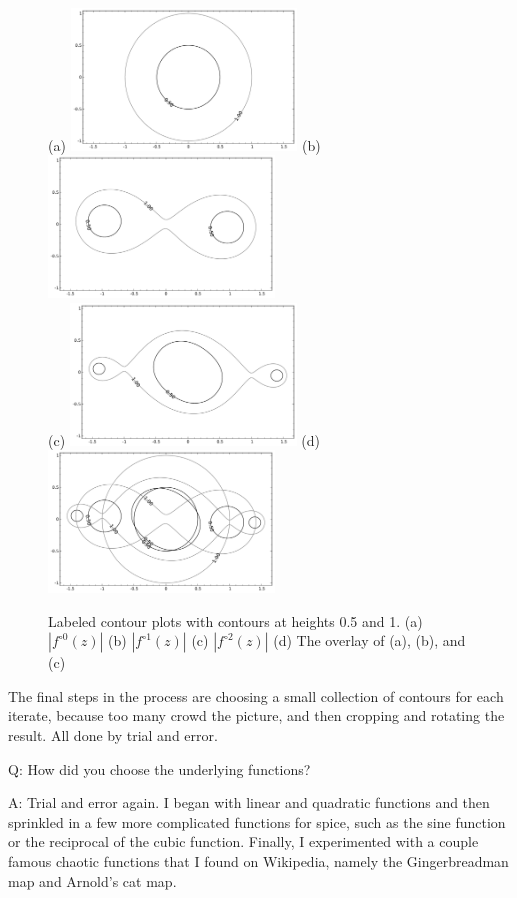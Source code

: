 \documentclass[12pt, a4paper]{amsart}
\begin{document}
\begin{figure}[!htb]
(a) \includegraphics[width=60mm]{tutorial_c0.pdf}\qquad
(b) \includegraphics[width=60mm]{tutorial_c1.pdf}\\
(c) \includegraphics[width=60mm]{tutorial_c2.pdf}\qquad
(d) \includegraphics[width=60mm]{tutorial_c012.pdf}
\caption{
Labeled contour plots with contours at heights 0.5 and 1.
(a) $|f^{\circ 0}(z)|$ 
(b) $|f^{\circ 1}(z)|$
(c) $|f^{\circ 2}(z)|$
(d) The overlay of (a), (b), and (c)
}
\label{fig:iterates}
\end{figure}

The final steps in the process are choosing a small collection of contours for each iterate, because too many crowd the picture, and then cropping and rotating the result.
All done by trial and error.

Q: How did you choose the underlying functions?

A: Trial and error again.
I began with linear and quadratic functions and then sprinkled in a few more complicated functions for spice, such as the sine function or the reciprocal of the cubic function.
Finally, I experimented with a couple famous chaotic functions that I found on Wikipedia, namely the Gingerbreadman map and Arnold's cat map.
\end{document}
